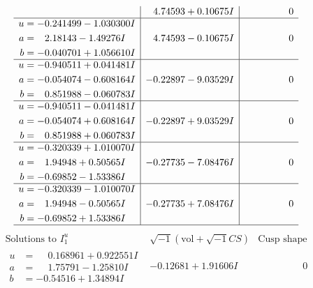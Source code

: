 \documentclass[1p]{elsarticle_modified}
\theoremstyle{definition}
\newcommand{\I}{\sqrt{-1}}
\begin{document}
$$\begin{array}{c|c|c}
 & \phantom{-}4.74593 + 0.10675 I & \phantom{-0.000000 } 0 \\ \hline\begin{aligned}
u &= -0.241499 - 1.030300 I \\
a &= \phantom{-}2.18143 - 1.49276 I \\
b &= -0.040701 + 1.056610 I\end{aligned}
 & \phantom{-}4.74593 - 0.10675 I & \phantom{-0.000000 } 0 \\ \hline\begin{aligned}
u &= -0.940511 + 0.041481 I \\
a &= -0.054074 - 0.608164 I \\
b &= \phantom{-}0.851988 - 0.060783 I\end{aligned}
 & -0.22897 - 9.03529 I & \phantom{-0.000000 } 0 \\ \hline\begin{aligned}
u &= -0.940511 - 0.041481 I \\
a &= -0.054074 + 0.608164 I \\
b &= \phantom{-}0.851988 + 0.060783 I\end{aligned}
 & -0.22897 + 9.03529 I & \phantom{-0.000000 } 0 \\ \hline\begin{aligned}
u &= -0.320339 + 1.010070 I \\
a &= \phantom{-}1.94948 + 0.50565 I \\
b &= -0.69852 - 1.53386 I\end{aligned}
 & -0.27735 - 7.08476 I & \phantom{-0.000000 } 0 \\ \hline\begin{aligned}
u &= -0.320339 - 1.010070 I \\
a &= \phantom{-}1.94948 - 0.50565 I \\
b &= -0.69852 + 1.53386 I\end{aligned}
 & -0.27735 + 7.08476 I & \phantom{-0.000000 } 0\\
 \hline 
 \end{array}$$\newpage$$\begin{array}{c|c|c}  
\text{Solutions to }I^u_{1}& \I (\text{vol} + \sqrt{-1}CS) & \text{Cusp shape}\\
 \hline 
\begin{aligned}
u &= \phantom{-}0.168961 + 0.922551 I \\
a &= \phantom{-}1.75791 - 1.25810 I \\
b &= -0.54516 + 1.34894 I\end{aligned}
 & -0.12681 + 1.91606 I & \phantom{-0.000000 } 0 \\ \hline\begin{aligned}

\end{aligned}
\end{array}$$
\end{document}
